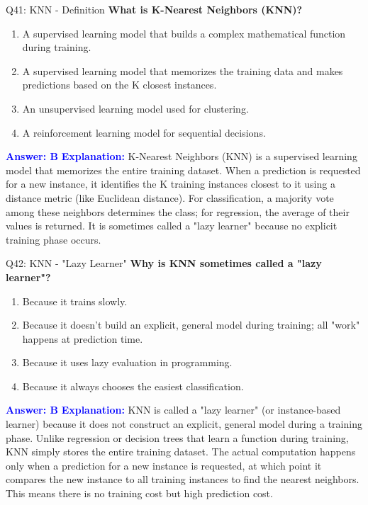 \documentclass[8pt]{beamer}
\begin{document}
	
	\begin{frame}{Q41: KNN - Definition}
		\fontsize{6.5}{7.5}\selectfont
		\textbf{What is K-Nearest Neighbors (KNN)?}
		\begin{enumerate}
			\item A supervised learning model that builds a complex mathematical function during training.
			\item A supervised learning model that memorizes the training data and makes predictions based on the K closest instances.
			\item An unsupervised learning model used for clustering.
			\item A reinforcement learning model for sequential decisions.
		\end{enumerate}
		\vspace{0.1cm}
		\textcolor{blue}{\textbf{Answer: B}}
		\vspace{0.1cm}
		\textcolor{blue}{\textbf{Explanation:}} K-Nearest Neighbors (KNN) is a supervised learning model that memorizes the entire training dataset. When a prediction is requested for a new instance, it identifies the K training instances closest to it using a distance metric (like Euclidean distance). For classification, a majority vote among these neighbors determines the class; for regression, the average of their values is returned. It is sometimes called a "lazy learner" because no explicit training phase occurs.
	\end{frame}
	
	\begin{frame}{Q42: KNN - "Lazy Learner"}
		\fontsize{6.5}{7.5}\selectfont
		\textbf{Why is KNN sometimes called a "lazy learner"?}
		\begin{enumerate}
			\item Because it trains slowly.
			\item Because it doesn't build an explicit, general model during training; all "work" happens at prediction time.
			\item Because it uses lazy evaluation in programming.
			\item Because it always chooses the easiest classification.
		\end{enumerate}
		\vspace{0.1cm}
		\textcolor{blue}{\textbf{Answer: B}}
		\vspace{0.1cm}
		\textcolor{blue}{\textbf{Explanation:}} KNN is called a "lazy learner" (or instance-based learner) because it does not construct an explicit, general model during a training phase. Unlike regression or decision trees that learn a function during training, KNN simply stores the entire training dataset. The actual computation happens only when a prediction for a new instance is requested, at which point it compares the new instance to all training instances to find the nearest neighbors. This means there is no training cost but high prediction cost.
	\end{frame}
	
\end{document}
